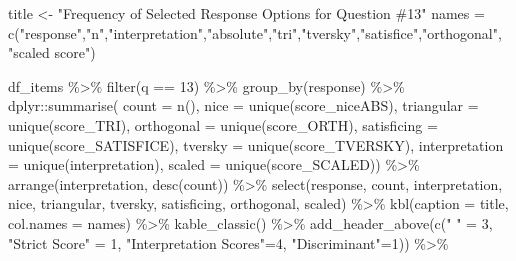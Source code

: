 \documentclass[
  letterpaper,
  DIV=11,
  numbers=noendperiod]{scrreprt}
\newenvironment{Shaded}{\begin{snugshade}}{\end{snugshade}}
\newcommand{\AttributeTok}[1]{\textcolor[rgb]{0.40,0.45,0.13}{#1}}
\newcommand{\DecValTok}[1]{\textcolor[rgb]{0.68,0.00,0.00}{#1}}
\newcommand{\FunctionTok}[1]{\textcolor[rgb]{0.28,0.35,0.67}{#1}}
\newcommand{\NormalTok}[1]{\textcolor[rgb]{0.00,0.23,0.31}{#1}}
\newcommand{\OtherTok}[1]{\textcolor[rgb]{0.00,0.23,0.31}{#1}}
\newcommand{\SpecialCharTok}[1]{\textcolor[rgb]{0.37,0.37,0.37}{#1}}
\newcommand{\StringTok}[1]{\textcolor[rgb]{0.13,0.47,0.30}{#1}}
\begin{document}
\begin{Shaded}
\begin{Highlighting}[]
\NormalTok{title }\OtherTok{\textless{}{-}} \StringTok{"Frequency of Selected Response Options for Question \#13"}
\NormalTok{names }\OtherTok{=} \FunctionTok{c}\NormalTok{(}\StringTok{"response"}\NormalTok{,}\StringTok{"n"}\NormalTok{,}\StringTok{"interpretation"}\NormalTok{,}\StringTok{"absolute"}\NormalTok{,}\StringTok{"tri"}\NormalTok{,}\StringTok{"tversky"}\NormalTok{,}\StringTok{"satisfice"}\NormalTok{,}\StringTok{"orthogonal"}\NormalTok{, }\StringTok{"scaled score"}\NormalTok{)}

\NormalTok{df\_items }\SpecialCharTok{\%\textgreater{}\%} \FunctionTok{filter}\NormalTok{(q }\SpecialCharTok{==} \DecValTok{13}\NormalTok{) }\SpecialCharTok{\%\textgreater{}\%} \FunctionTok{group\_by}\NormalTok{(response) }\SpecialCharTok{\%\textgreater{}\%}
\NormalTok{  dplyr}\SpecialCharTok{::}\FunctionTok{summarise}\NormalTok{( }\AttributeTok{count =} \FunctionTok{n}\NormalTok{(),}
                    \AttributeTok{nice =} \FunctionTok{unique}\NormalTok{(score\_niceABS),}
                    \AttributeTok{triangular =} \FunctionTok{unique}\NormalTok{(score\_TRI),}
                    \AttributeTok{orthogonal =}  \FunctionTok{unique}\NormalTok{(score\_ORTH),}
                    \AttributeTok{satisficing =}  \FunctionTok{unique}\NormalTok{(score\_SATISFICE),}
                    \AttributeTok{tversky =} \FunctionTok{unique}\NormalTok{(score\_TVERSKY),}
                    \AttributeTok{interpretation =} \FunctionTok{unique}\NormalTok{(interpretation),}
                    \AttributeTok{scaled =} \FunctionTok{unique}\NormalTok{(score\_SCALED)) }\SpecialCharTok{\%\textgreater{}\%}
  \FunctionTok{arrange}\NormalTok{(interpretation, }\FunctionTok{desc}\NormalTok{(count)) }\SpecialCharTok{\%\textgreater{}\%}
  \FunctionTok{select}\NormalTok{(response, count, interpretation, nice,}
\NormalTok{         triangular, tversky, satisficing, orthogonal, scaled) }\SpecialCharTok{\%\textgreater{}\%}
  \FunctionTok{kbl}\NormalTok{(}\AttributeTok{caption =}\NormalTok{ title, }\AttributeTok{col.names =}\NormalTok{ names) }\SpecialCharTok{\%\textgreater{}\%}  \FunctionTok{kable\_classic}\NormalTok{() }\SpecialCharTok{\%\textgreater{}\%}
  \FunctionTok{add\_header\_above}\NormalTok{(}\FunctionTok{c}\NormalTok{(}\StringTok{" "} \OtherTok{=} \DecValTok{3}\NormalTok{, }\StringTok{"Strict Score"} \OtherTok{=} \DecValTok{1}\NormalTok{, }\StringTok{"Interpretation Scores"}\OtherTok{=}\DecValTok{4}\NormalTok{, }\StringTok{"Discriminant"}\OtherTok{=}\DecValTok{1}\NormalTok{)) }\SpecialCharTok{\%\textgreater{}\%}

\end{Highlighting}
\end{Shaded}
\end{document}
